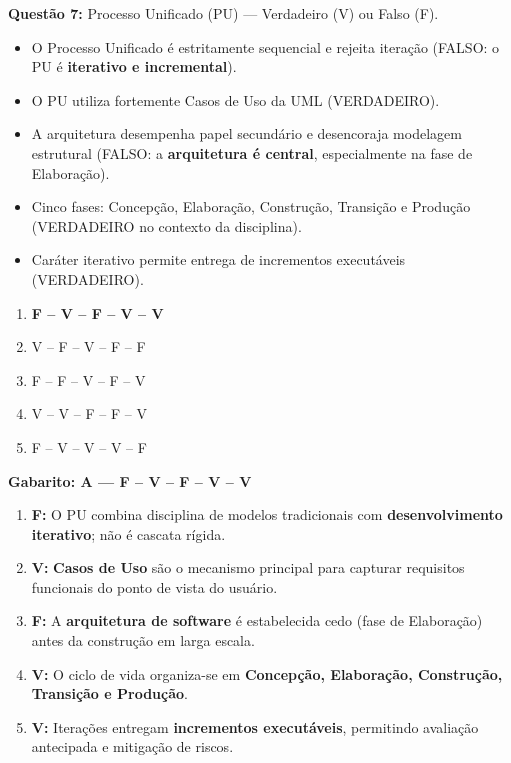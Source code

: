 \documentclass[12pt,a4paper]{article}
\begin{document}
\vspace{0.6cm}

\textbf{Questão 7:} Processo Unificado (PU) --- Verdadeiro (V) ou Falso (F).

\begin{itemize}[itemsep=0.2cm]
    \item[{[\textbf{F}]}] O Processo Unificado é estritamente sequencial e rejeita iteração (FALSO: o PU é \textbf{iterativo e incremental}).
    \item[{[\textbf{V}]}] O PU utiliza fortemente Casos de Uso da UML (VERDADEIRO).
    \item[{[\textbf{F}]}] A arquitetura desempenha papel secundário e desencoraja modelagem estrutural (FALSO: a \textbf{arquitetura é central}, especialmente na fase de Elaboração).
    \item[{[\textbf{V}]}] Cinco fases: Concepção, Elaboração, Construção, Transição e Produção (VERDADEIRO no contexto da disciplina).
    \item[{[\textbf{V}]}] Caráter iterativo permite entrega de incrementos executáveis (VERDADEIRO).
\end{itemize}

\begin{enumerate}[label=\textbf{\Alph*)}, itemsep=0.2cm]
    \item[\textbf{A)}] \textbf{F -- V -- F -- V -- V} \checkmark
    \item V -- F -- V -- F -- F
    \item F -- F -- V -- F -- V
    \item V -- V -- F -- F -- V
    \item F -- V -- V -- V -- F
\end{enumerate}

\begin{tcolorbox}[respostabox]
\textbf{Gabarito: A --- F -- V -- F -- V -- V}

\begin{enumerate}
    \item \textbf{F:} O PU combina disciplina de modelos tradicionais com \textbf{desenvolvimento iterativo}; não é cascata rígida.
    \item \textbf{V:} \textbf{Casos de Uso} são o mecanismo principal para capturar requisitos funcionais do ponto de vista do usuário.
    \item \textbf{F:} A \textbf{arquitetura de software} é estabelecida cedo (fase de Elaboração) antes da construção em larga escala.
    \item \textbf{V:} O ciclo de vida organiza-se em \textbf{Concepção, Elaboração, Construção, Transição e Produção}.
    \item \textbf{V:} Iterações entregam \textbf{incrementos executáveis}, permitindo avaliação antecipada e mitigação de riscos.
\end{enumerate}
\end{tcolorbox}
\end{document}

